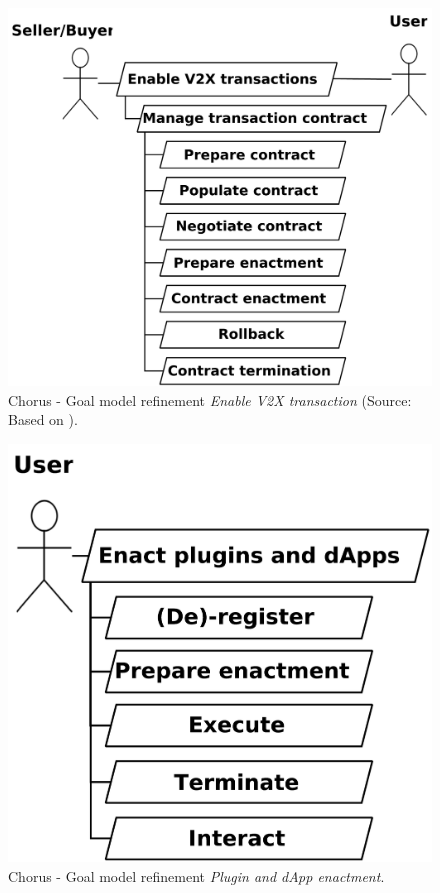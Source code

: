 \documentclass{llncs}
\begin{document}
{				\begin{figure}[H]
					\centering
					\includegraphics[scale=0.175]{Figures/aom/20180501_goal-model--refined-3.pdf}
					\caption{Chorus - Goal model refinement \textit{Enable V2X transaction}  (Source: Based on \cite{leidingM2M}).}	
					\label{fig:refined-aom-goal-model-3}
				\end{figure}
				
				\begin{figure}[H]
					\centering
					\includegraphics[scale=0.175]{Figures/aom/20180501_goal-model--refined-4.pdf}
					\caption{Chorus - Goal model refinement \textit{Plugin and dApp enactment}.}	
					\label{fig:refined-aom-goal-model-4}
				\end{figure}


}
\end{document}
